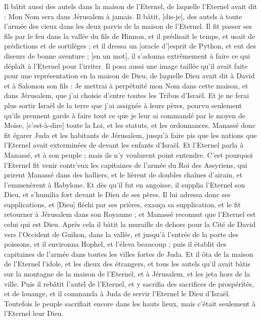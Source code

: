 \begin{multicols}{2}
Il bâtit aussi des autels dans la maison de l'Eternel, de laquelle l'Eternel avait dit : Mon Nom sera dans Jérusalem à jamais.
Il bâtit, [dis-je], des autels à toute l'armée des cieux dans les deux parvis de la maison de l'Eternel.
Il fit passer ses fils par le feu dans la vallée du fils de Hinnon, et il prédisait le temps, et usait de prédictions et de sortilèges ; et il dressa un [oracle d']esprit de Python, et eut des diseurs de bonne aventure ; [en un mot], il s'adonna extrêmement à faire ce qui déplaît à l'Eternel pour l'irriter.
Il posa aussi une image taillée qu'il avait faite pour une représentation en la maison de Dieu, de laquelle Dieu avait dit à David et à Salomon son fils : Je mettrai à perpétuité mon Nom dans cette maison, et dans Jérusalem, que j'ai choisie d'entre toutes les Tribus d'Israël.
Et je ne ferai plus sortir Israël de la terre que j'ai assignée à leurs pères, pourvu seulement qu'ils prennent garde à faire tout ce que je leur ai commandé par le moyen de Moïse, [c'est-à-dire] toute la Loi, et les statuts, et les ordonnances.
Manassé donc fit égarer Juda et les habitants de Jérusalem, jusqu'à faire pis que les nations que l'Eternel avait exterminées de devant les enfants d'Israël.
Et l'Eternel parla à Manassé, et à son peuple ; mais ils n'y voulurent point entendre.
C'est pourquoi l'Eternel fit venir contr'eux les capitaines de l'armée du Roi des Assyriens, qui prirent Manassé dans des halliers, et le lièrent de doubles chaînes d'airain, et l'emmenèrent à Babylone.
Et dès qu'il fut en angoisse, il supplia l'Eternel son Dieu, et s'humilia fort devant le Dieu de ses pères.
Il lui adressa donc ses supplications, et [Dieu] fléchi par ses prières, exauça sa supplication, et le fit retourner à Jérusalem dans son Royaume ; et Manassé reconnut que l'Eternel est celui qui est Dieu.
Après cela il bâtit la muraille de dehors pour la Cité de David vers l'Occident de Guihon, dans la vallée, et jusqu'à l'entrée de la porte des poissons, et il environna Hophel, et l'éleva beaucoup ; puis il établit des capitaines de l'armée dans toutes les villes fortes de Juda.
Et il ôta de la maison de l'Eternel l'idole, et les dieux des étrangers, et tous les autels qu'il avait bâtis sur la montagne de la maison de l'Eternel, et à Jérusalem, et les jeta hors de la ville.
Puis il rebâtit l'autel de l'Eternel, et y sacrifia des sacrifices de prospérités, et de louange, et il commanda à Juda de servir l'Eternel le Dieu d'Israël.
Toutefois le peuple sacrifiait encore dans les hauts lieux, mais c'était seulement à l'Eternel leur Dieu.

\end{multicols}
